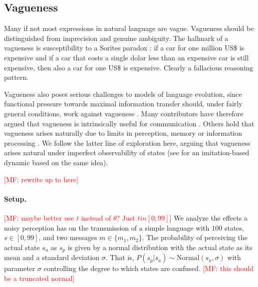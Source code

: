 \documentclass[10pt,a4paper]{article}
\newcommand{\mf}[1]{\textcolor{Red}{[MF: #1]}}
\begin{document}

\subsection{Vagueness}

Many if not most expressions in natural language are vague. Vagueness should be distinguished
from imprecision and genuine ambiguity. The hallmark of a vagueness is susceptibility to a
Sorites paradox \citep[e.g.][]{Williamson1994:Vagueness}: if a car for one million US\$ is
expensive and if a car that costs a single dolar less than an expensive car is still expensive,
then also a car for one US\$ is expensive. Clearly a fallacious reasoning pattern.

Vagueness also poses serious challenges to models of language evolution, since functional
pressure towards maximal information transfer should, under fairly general conditions, work
against vagueness \citep{Lipman2009:Why-is-Language}. Many contributors have therefore argued
that vagueness is intrinsically useful for communication
\citep[e.g.][]{Deemter2009:Utility-and-Lan,Jaegherde-JaegherRooijvan-Rooij2010:Strategic-Vague,BlumeBoard2013:Intentional-Vag}. Others
hold that vagueness arises naturally due to limits in perception, memory or information
processing
\citep[e.g.][]{FrankeJager2010:Vagueness-Signa,LassiterGoodman2015:Adjectival-vagu,OConnor2013:The-Evolution-o}. We
follow the latter line of exploration here, arguing that vagueness arises natural under
imperfect observability of states (see \cite{franke+correia:toappear} for an imitation-based
dynamic based on the same idea).

\mf{rewrite up to here}

\paragraph{Setup.} \mf{maybe better use $t$ instead of $\theta$? Just $t in [0;99]$} We analyze
the effects a noisy perception has on the transmission of a simple language with $100$
states, $s \in [0,99]$, and two messages $m \in \{m_1,m_2\}$. The probability of perceiving the
actual state $s_a$ as $s_p$ is given by a normal distribution with the actual state as its mean
and a standard deviation $\sigma$. That is, $P(s_p | s_a) \sim \text{Normal}(s_{a},\sigma)$
with parameter $\sigma$ controlling the degree to which states are confused. \mf{this should be
a truncated normal}
\end{document}
